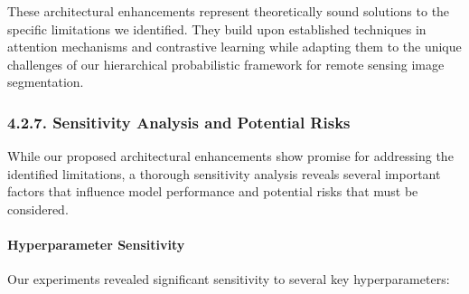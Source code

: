 \documentclass[conference]{IEEEtran}
\begin{document}
These architectural enhancements represent theoretically sound solutions to the specific limitations we identified. They build upon established techniques in attention mechanisms and contrastive learning while adapting them to the unique challenges of our hierarchical probabilistic framework for remote sensing image segmentation.

\subsubsection*{4.2.7. Sensitivity Analysis and Potential Risks}

While our proposed architectural enhancements show promise for addressing the identified limitations, a thorough sensitivity analysis reveals several important factors that influence model performance and potential risks that must be considered.

\paragraph{Hyperparameter Sensitivity}

Our experiments revealed significant sensitivity to several key hyperparameters:
\end{document}
